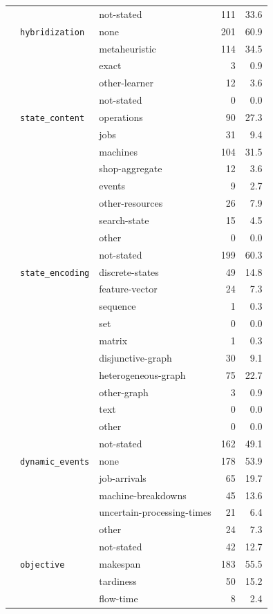 \begin{longtable}{lllr@{\hspace{1.0em}}r}
 &  & not-stated & 111 & 33.6 \\
 & \texttt{hybridization} & none & 201 & 60.9 \\
 &  & metaheuristic & 114 & 34.5 \\
 &  & exact & 3 & 0.9 \\
 &  & other-learner & 12 & 3.6 \\
 &  & not-stated & 0 & 0.0 \\
 & \texttt{state\_content} & operations & 90 & 27.3 \\
 &  & jobs & 31 & 9.4 \\
 &  & machines & 104 & 31.5 \\
 &  & shop-aggregate & 12 & 3.6 \\
 &  & events & 9 & 2.7 \\
 &  & other-resources & 26 & 7.9 \\
 &  & search-state & 15 & 4.5 \\
 &  & other & 0 & 0.0 \\
 &  & not-stated & 199 & 60.3 \\
 & \texttt{state\_encoding} & discrete-states & 49 & 14.8 \\
 &  & feature-vector & 24 & 7.3 \\
 &  & sequence & 1 & 0.3 \\
 &  & set & 0 & 0.0 \\
 &  & matrix & 1 & 0.3 \\
 &  & disjunctive-graph & 30 & 9.1 \\
 &  & heterogeneous-graph & 75 & 22.7 \\
 &  & other-graph & 3 & 0.9 \\
 &  & text & 0 & 0.0 \\
 &  & other & 0 & 0.0 \\
 &  & not-stated & 162 & 49.1 \\
 & \texttt{dynamic\_events} & none & 178 & 53.9 \\
 &  & job-arrivals & 65 & 19.7 \\
 &  & machine-breakdowns & 45 & 13.6 \\
 &  & uncertain-processing-times & 21 & 6.4 \\
 &  & other & 24 & 7.3 \\
 &  & not-stated & 42 & 12.7 \\
 & \texttt{objective} & makespan & 183 & 55.5 \\
 &  & tardiness & 50 & 15.2 \\
 &  & flow-time & 8 & 2.4 \\

\end{longtable}
